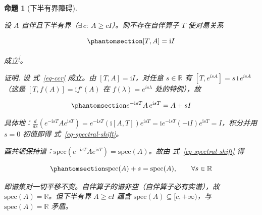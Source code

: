 \documentclass[
  chinese,
  a4paper,
  UTF8,
  12pt,
  oneside,
  openany]{ctexbook}
\theoremstyle{plain}
\theoremstyle{plain}
\theoremstyle{plain}
\newtheorem{proposition}{命题}[chapter]
\theoremstyle{definition}
\theoremstyle{plain}
\theoremstyle{plain}
\theoremstyle{remark}
\begin{document}
\begin{proposition}[下半有界障碍]\protect\hypertarget{prp-downbounded}{}\label{prp-downbounded}

设 \(A\) 自伴且下半有界（\(\exists\,c:\ A\ge cI\)）。则不存在自伴算子
\(T\) 使对易关系

\begin{equation}\protect\phantomsection\label{eq-ccr}{
[T,A]=\mathrm{i}I
}\end{equation}

成立\textsuperscript{{[}\citeproc{ref-busch1995}{30}{]}}。

\emph{证明.} 设 式~\ref{eq-ccr} 成立。由 \([T,A]=\mathrm{i}I\)，对任意
\(s\in\mathbb{R}\) 有
\(\left[T,e^{isA}\right]=s\,\mathrm{i}\,e^{isA}\)（这是
\([T,f(A)]=\mathrm{i}f'(A)\) 在 \(f(\lambda)=e^{is\lambda}\)
处的特例），故

\begin{equation}\protect\phantomsection\label{eq-spectral-shift}{
e^{-\mathrm{i}sT}A\,e^{\mathrm{i}sT}=A+sI
}\end{equation}

具体地：\(\frac{d}{ds}\left(e^{-\mathrm{i}sT}Ae^{\mathrm{i}sT}\right)=e^{-\mathrm{i}sT}\left(\mathrm{i}[A,T]\right)e^{\mathrm{i}sT}=\mathrm{i}e^{-\mathrm{i}sT}\left(-\mathrm{i}I\right)e^{\mathrm{i}sT}=I\)，积分并用
\(s=0\) 初值即得 式~\ref{eq-spectral-shift}。

酉共轭保持谱：\(\mathrm{spec}\left(e^{-\mathrm{i}sT}Ae^{\mathrm{i}sT}\right)=\mathrm{spec}(A)\)。故由
式~\ref{eq-spectral-shift} 得

\begin{equation}\protect\phantomsection\label{eq-spectrum-invariant}{
\mathrm{spec}(A)+s=\mathrm{spec}(A),
\qquad \forall s\in\mathbb{R}
}\end{equation}

即谱集对一切平移不变。自伴算子的谱非空（自伴算子必有实谱），故
\(\mathrm{spec}(A)=\mathbb{R}\)。但下半有界 \(A\ge cI\) 蕴含
\(\mathrm{spec}(A)\subseteq[c,+\infty)\)，与
\(\mathrm{spec}(A)=\mathbb{R}\) 矛盾。

\end{proposition}
\end{document}
